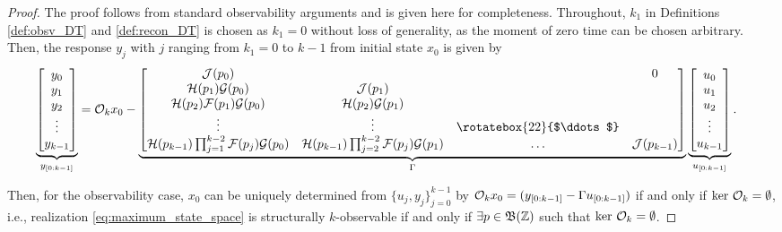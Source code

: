 \begin{proof}
    The proof follows from standard observability arguments \cite{Gohberg1992} and is given here for completeness. Throughout, $k_1$ in Definitions \ref{def:obsv_DT} and \ref{def:recon_DT} is chosen as $k_1 = 0$ without loss of generality, as the moment of zero time can be chosen arbitrary. Then, the response $y_j$ with $j$ ranging from $k_1=0$ to $k-1$ from initial state $x_0$ is given by
    \begin{equation}\label{eq:DT_response}
    \begin{aligned}
        \underbrace{\begin{bmatrix}
            y_0 \\ y_1 \\ y_{2} \\ \vdots \\ y_{k-1}
        \end{bmatrix}}_{y_{[0:k-1]}}
        &=
        \Ocal_k x_0
        -
        \underbrace{\begin{bmatrix}
        \Jcal(p_0) & & & 0\\
        \Hcal(p_1) \Gcal(p_0) & \Jcal(p_1) & & \\
        \Hcal(p_2) \Fcal(p_1) \Gcal(p_0) & \Hcal(p_2) \Gcal(p_1) & &  \\
        \vdots & \vdots & \raisebox{0pt}{\rotatebox{22}{$\ddots$}}\\
        \Hcal(p_{k-1}) \prod_{j=1}^{k-2} \Fcal(p_j) \Gcal(p_0) & \Hcal(p_{k-1}) \prod_{j=2}^{k-2} \Fcal(p_j) \Gcal(p_1) & \hdots & \Jcal(p_{k-1})
        \end{bmatrix}}_{\Gamma}
        \underbrace{\begin{bmatrix}
            u_0 \\ u_1 \\ u_2 \\ \vdots \\ u_{k-1}
        \end{bmatrix}}_{u_{[0:k-1]}}.
    \end{aligned}
    \end{equation}

    Then, for the observability case, $x_0$ can be uniquely determined from $\{u_j, y_j\}_{j=0}^{k-1}$ by $\mathcal{O}_k x_0 = (y_{[0:k-1]} - \Gamma u_{[0:k-1]})$ if and only if $\ker\ \Ocal_k = \emptyset$, i.e., realization \eqref{eq:maximum_state_space} is structurally $k$-observable if and only if $\exists p\in \mathfrak{B}(\mathbb{Z})$ such that $\ker\ \Ocal_k = \emptyset$. %
    

\end{proof}
